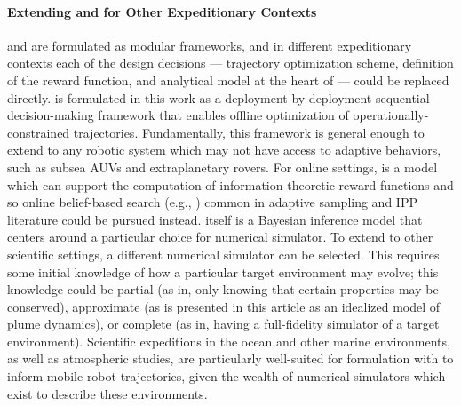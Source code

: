 \paragraph{Extending \PHORTEX and \PHUMES for Other Expeditionary Contexts}
\PHORTEX and \PHUMES are formulated as modular frameworks, and in different expeditionary contexts each of the design decisions --- trajectory optimization scheme, definition of the reward function, and analytical model at the heart of \PHUMES --- could be replaced directly. \PHORTEX is formulated in this work as a deployment-by-deployment sequential decision-making framework that enables offline optimization of operationally-constrained trajectories. Fundamentally, this framework is general enough to extend to any robotic system which may not have access to adaptive behaviors, such as subsea AUVs and extraplanetary rovers. For online settings, \PHUMES is a model which can support the computation of information-theoretic reward functions and so online belief-based search (e.g., \cite{flaspohler2019information, Arora2017, Sun2017, sunberg2018online}) common in adaptive sampling and IPP literature could be pursued instead. \PHUMES itself is a Bayesian inference model that centers around a particular choice for numerical simulator. To extend to other scientific settings, a different numerical simulator can be selected. This requires some initial knowledge of how a particular target environment may evolve; this knowledge could be partial (as in, only knowing that certain properties may be conserved), approximate (as is presented in this article as an idealized model of plume dynamics), or complete (as in, having a full-fidelity simulator of a target environment). Scientific expeditions in the ocean and other marine environments, as well as atmospheric studies, are particularly well-suited for formulation with \PHUMES to inform mobile robot trajectories, given the wealth of numerical simulators which exist to describe these environments. 


